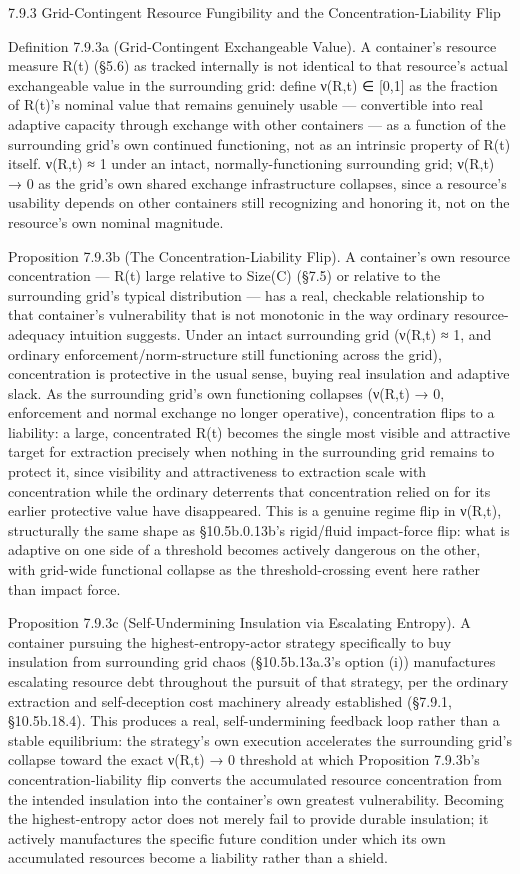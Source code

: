 \documentclass[
]{article}
\begin{document}
7.9.3 Grid-Contingent Resource Fungibility and the
Concentration-Liability Flip

Definition 7.9.3a (Grid-Contingent Exchangeable Value). A container's
resource measure R(t) (§5.6) as tracked internally is not identical to
that resource's actual exchangeable value in the surrounding grid:
define ν(R,t) ∈ {[}0,1{]} as the fraction of R(t)'s nominal value that
remains genuinely usable --- convertible into real adaptive capacity
through exchange with other containers --- as a function of the
surrounding grid's own continued functioning, not as an intrinsic
property of R(t) itself. ν(R,t) ≈ 1 under an intact,
normally-functioning surrounding grid; ν(R,t) → 0 as the grid's own
shared exchange infrastructure collapses, since a resource's usability
depends on other containers still recognizing and honoring it, not on
the resource's own nominal magnitude.

Proposition 7.9.3b (The Concentration-Liability Flip). A container's own
resource concentration --- R(t) large relative to Size(C) (§7.5) or
relative to the surrounding grid's typical distribution --- has a real,
checkable relationship to that container's vulnerability that is not
monotonic in the way ordinary resource-adequacy intuition suggests.
Under an intact surrounding grid (ν(R,t) ≈ 1, and ordinary
enforcement/norm-structure still functioning across the grid),
concentration is protective in the usual sense, buying real insulation
and adaptive slack. As the surrounding grid's own functioning collapses
(ν(R,t) → 0, enforcement and normal exchange no longer operative),
concentration flips to a liability: a large, concentrated R(t) becomes
the single most visible and attractive target for extraction precisely
when nothing in the surrounding grid remains to protect it, since
visibility and attractiveness to extraction scale with concentration
while the ordinary deterrents that concentration relied on for its
earlier protective value have disappeared. This is a genuine regime flip
in ν(R,t), structurally the same shape as §10.5b.0.13b's rigid/fluid
impact-force flip: what is adaptive on one side of a threshold becomes
actively dangerous on the other, with grid-wide functional collapse as
the threshold-crossing event here rather than impact force.

Proposition 7.9.3c (Self-Undermining Insulation via Escalating Entropy).
A container pursuing the highest-entropy-actor strategy specifically to
buy insulation from surrounding grid chaos (§10.5b.13a.3's option (i))
manufactures escalating resource debt throughout the pursuit of that
strategy, per the ordinary extraction and self-deception cost machinery
already established (§7.9.1, §10.5b.18.4). This produces a real,
self-undermining feedback loop rather than a stable equilibrium: the
strategy's own execution accelerates the surrounding grid's collapse
toward the exact ν(R,t) → 0 threshold at which Proposition 7.9.3b's
concentration-liability flip converts the accumulated resource
concentration from the intended insulation into the container's own
greatest vulnerability. Becoming the highest-entropy actor does not
merely fail to provide durable insulation; it actively manufactures the
specific future condition under which its own accumulated resources
become a liability rather than a shield.
\end{document}
